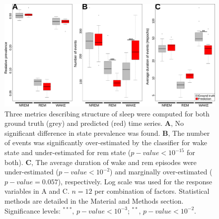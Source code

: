 \begin{figure}[h!]
  \centering   
    \includegraphics[width=1.0\textwidth]{figures/struct_assess.pdf}
  \caption{
  Three metrics describing structure of sleep were computed for both ground truth (grey) and predicted (red) time series.
  \textbf{A}, No significant difference in state prevalence was found.
  \textbf{B}, The number of events was significantly over-estimated by the classifier
   for wake state and under-estimated for \gls{rem} state ($p-value < 10^{-15}$ for both).
  \textbf{C}, The average duration of wake and \gls{rem} episodes
  were under-estimated ($p-value < 10^{-2}$) and marginally over-estimated ($p-value = 0.057$), respectively.
  Log scale was used for the response variables in A and C. 
  $n = 12$ per combination of factors.
  Statistical methods are detailed in the Material and Methods section.
  Significance levels: $^{***}$, $p-value < 10^{-3}$;  $^{**}$, $p-value < 10^{-2}$.
  \label{fig:struct_assess}
  }
\end{figure}
